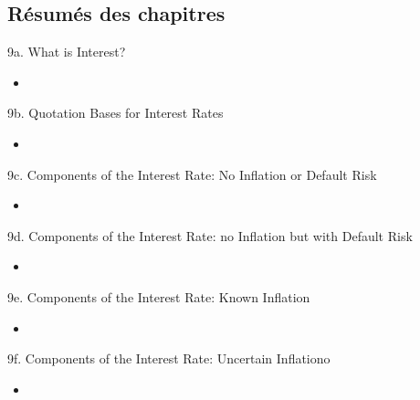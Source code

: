 \subsection{Résumés des chapitres}

\begin{CHPT_SUMM_AUTO}[label = {L.-9a}]{9a. What is Interest?}
	\begin{itemize}
		\item	
	\end{itemize}
\end{CHPT_SUMM_AUTO}

\begin{CHPT_SUMM_AUTO}[label = {L.-9b}]{9b. Quotation Bases for Interest Rates}
	\begin{itemize}
		\item	
	\end{itemize}
\end{CHPT_SUMM_AUTO}

\begin{CHPT_SUMM_AUTO}[label = {L.-9c}]{9c. Components of the Interest Rate: No Inflation or Default Risk}
	\begin{itemize}
		\item	
	\end{itemize}
\end{CHPT_SUMM_AUTO}

\begin{CHPT_SUMM_AUTO}[label = {L.-9d}]{9d. Components of the Interest Rate: no Inflation but with Default Risk}
	\begin{itemize}
		\item	
	\end{itemize}
\end{CHPT_SUMM_AUTO}

\begin{CHPT_SUMM_AUTO}[label = {L.-9e}]{9e. Components of the Interest Rate: Known Inflation}
	\begin{itemize}
		\item	
	\end{itemize}
\end{CHPT_SUMM_AUTO}

\begin{CHPT_SUMM_AUTO}[label = {L.-9f}]{9f. Components of the Interest Rate: Uncertain Inflationo}
	\begin{itemize}
		\item	
	\end{itemize}
\end{CHPT_SUMM_AUTO}

